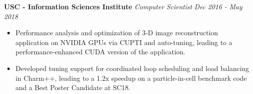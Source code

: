 \newcommand{\myExpFive}{
\item Performance analysis and optimization of 3-D image reconstruction application on NVIDIA GPUs via CUPTI and auto-tuning, leading to a performance-enhanced CUDA version of the application. 
\item Developed tuning support for coordinated loop scheduling and load balancing in Charm++, leading to a 1.2x speedup on a particle-in-cell benchmark code and a Best Poster Candidate at SC18.

}
\noindent
\textbf{USC - Information Sciences Institute}\hfill
\textit{Computer Scientist} \hfill \textit{Dec 2016 - May 2018}
\begin{itemize}[itemsep=-0.1em]
\myExpFive
\end{itemize}




